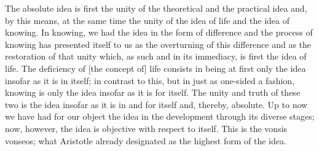     The absolute idea is first the unity of the theoretical and the practical idea and,
    by this means, at the same time the unity of the idea of life and the idea of knowing.
    In knowing, we had the idea in the form of difference and
    the process of knowing has presented itself to us as the overturning of
    this difference and as the restoration of that unity which,
    as such and in its immediacy, is first the idea of life.
    The deficiency of [the concept of] life consists
    in being at first only the idea insofar as it is in itself;
    in contrast to this, but in just as one-sided a fashion,
    knowing is only the idea insofar as it is for itself.
    The unity and truth of these two is the idea insofar as
    it is in and for itself and, thereby, absolute.
    Up to now we have had for our object
    the idea in the development through its diverse stages;
    now, however, the idea is objective with respect to itself.
    This is the vonsis vonseos; what Aristotle already designated as the highest form of the idea.

